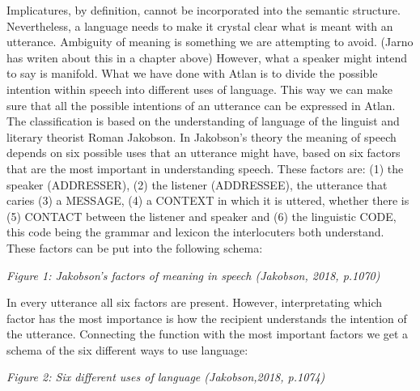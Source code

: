 Implicatures, by definition, cannot be incorporated into the semantic structure. Nevertheless, a language needs to make it crystal clear what is meant with an utterance. Ambiguity of meaning is something we are attempting to avoid. (Jarno has writen about this in a chapter above) However, what a speaker might intend to say is manifold. What we have done with Atlan is to divide the possible intention within speech into different uses of language. This way we can make sure that all the possible intentions of an utterance can be expressed in Atlan. The classification is based on the understanding of language of the linguist and literary theorist Roman Jakobson. In Jakobson's theory the meaning of speech depends on six possible uses that an utterance might have, based on six factors that are the most important in understanding speech. These factors are: (1) the speaker (ADDRESSER), (2) the listener (ADDRESSEE), the utterance that caries (3) a MESSAGE, (4) a CONTEXT in which it is uttered, whether there is (5) CONTACT between the listener and speaker and (6) the linguistic CODE, this code being the grammar and lexicon the interlocuters both understand. These factors can be put into the following schema:


{\it Figure 1: Jakobson's factors of meaning in speech (Jakobson, 2018, p.1070)}
\vspace{0.3cm}

\noindent In every utterance all six factors are present. However, interpretating which factor has the most importance is how the recipient understands the intention of the utterance. Connecting the function with the most important factors we get a schema of the six different ways to use language: 

\vspace{0.3cm}


{\it \footnotesize Figure 2: Six different uses of language (Jakobson,2018, p.1074)}

